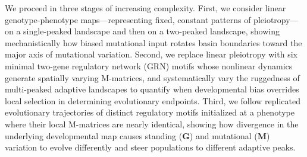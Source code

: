 We proceed in three stages of increasing complexity.
First, we consider linear genotype-phenotype maps---representing fixed, constant patterns of pleiotropy---on a single-peaked landscape and then on a two-peaked landscape, showing mechanistically how biased mutational input rotates basin boundaries toward the major axis of mutational variation.
Second, we replace linear pleiotropy with six minimal two-gene regulatory network (GRN) motifs whose nonlinear dynamics generate spatially varying M-matrices, and systematically vary the ruggedness of multi-peaked adaptive landscapes to quantify when developmental bias overrides local selection in determining evolutionary endpoints.
Third, we follow replicated evolutionary trajectories of distinct regulatory motifs initialized at a phenotype where their local M-matrices are nearly identical, showing how divergence in the underlying developmental map causes standing ($\mathbf{G}$) and mutational ($\mathbf{M}$) variation to evolve differently and steer populations to different adaptive peaks.

